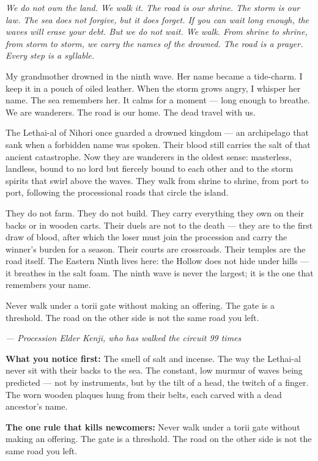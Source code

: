 \noindent
{\Large
\textit{We do not own the land. We walk it. The road is our shrine. The storm is our law. The sea does not forgive, but it does forget. If you can wait long enough, the waves will erase your debt. But we do not wait. We walk. From shrine to shrine, from storm to storm, we carry the names of the drowned. The road is a prayer. Every step is a syllable.}

\vspace{0.5em}

My grandmother drowned in the ninth wave. Her name became a tide-charm. I keep it in a pouch of oiled leather. When the storm grows angry, I whisper her name. The sea remembers her. It calms for a moment --- long enough to breathe. We are wanderers. The road is our home. The dead travel with us.

\vspace{0.5em}

The Lethai-al of Nihori once guarded a drowned kingdom --- an archipelago that sank when a forbidden name was spoken. Their blood still carries the salt of that ancient catastrophe. Now they are wanderers in the oldest sense: masterless, landless, bound to no lord but fiercely bound to each other and to the storm spirits that swirl above the waves. They walk from shrine to shrine, from port to port, following the processional roads that circle the island.

They do not farm. They do not build. They carry everything they own on their backs or in wooden carts. Their duels are not to the death --- they are to the first draw of blood, after which the loser must join the procession and carry the winner's burden for a season. Their courts are crossroads. Their temples are the road itself. The Eastern Ninth lives here: the Hollow does not hide under hills --- it breathes in the salt foam. The ninth wave is never the largest; it is the one that remembers your name.

\vspace{0.5em}

Never walk under a torii gate without making an offering. The gate is a threshold. The road on the other side is not the same road you left.

\vspace{1em}

\noindent\textit{--- Procession Elder Kenji, who has walked the circuit 99 times}
}

\vspace{1em}

\begin{tcolorbox}[colback=black!3,colframe=blue!60!black,title={Theme \& Atmosphere},breakable]
\textbf{What you notice first:} The smell of salt and incense. The way the Lethai-al never sit with their backs to the sea. The constant, low murmur of waves being predicted --- not by instruments, but by the tilt of a head, the twitch of a finger. The worn wooden plaques hung from their belts, each carved with a dead ancestor's name.

\textbf{The one rule that kills newcomers:} Never walk under a torii gate without making an offering. The gate is a threshold. The road on the other side is not the same road you left.
\end{tcolorbox}

